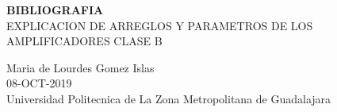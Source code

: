 \documentclass[11pt,a4paper]{article}
\begin{document}
\begin{center}
\textbf{BIBLIOGRAFIA}\\
EXPLICACION DE ARREGLOS Y PARAMETROS DE LOS AMPLIFICADORES CLASE B
\end{center}

\begin{center}
Maria de Lourdes Gomez Islas\\
08-OCT-2019\\
Universidad Politecnica de La Zona Metropolitana de Guadalajara
\end{center}

\cite{huircan2012}
\cite{huircan83amplificadores}


\end{document}
